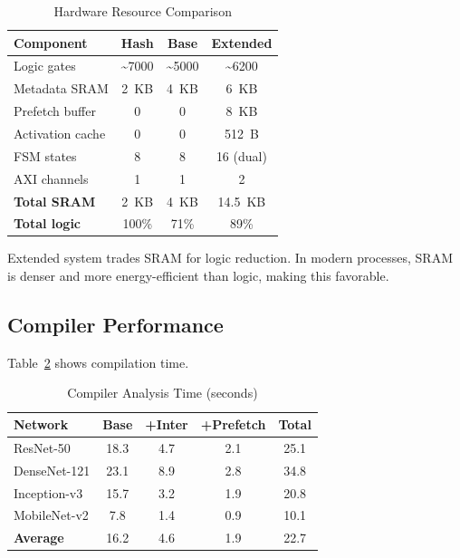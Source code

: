 \documentclass[journal]{IEEEtran}
\begin{document}
\begin{table}[t]
\centering
\caption{Hardware Resource Comparison}
\label{tab:resources_extended}
\small
\begin{tabular}{lccc}
\toprule
\textbf{Component} & \textbf{Hash} & \textbf{Base} & \textbf{Extended} \\
\midrule
Logic gates & \textasciitilde7000 & \textasciitilde5000 & \textasciitilde6200 \\
Metadata SRAM & 2~KB & 4~KB & 6~KB \\
Prefetch buffer & 0 & 0 & 8~KB \\
Activation cache & 0 & 0 & 512~B \\
FSM states & 8 & 8 & 16 (dual) \\
AXI channels & 1 & 1 & 2 \\
\midrule
\textbf{Total SRAM} & 2~KB & 4~KB & 14.5~KB \\
\textbf{Total logic} & 100\% & 71\% & 89\% \\
\bottomrule
\end{tabular}
\end{table}

Extended system trades SRAM for logic reduction. In modern processes, SRAM is denser and more energy-efficient than logic, making this favorable.

\subsection{Compiler Performance}

Table~\ref{tab:compile_time} shows compilation time.

\begin{table}[t]
\centering
\caption{Compiler Analysis Time (seconds)}
\label{tab:compile_time}
\small
\begin{tabular}{lcccc}
\toprule
\textbf{Network} & \textbf{Base} & \textbf{+Inter} & \textbf{+Prefetch} & \textbf{Total} \\
\midrule
ResNet-50 & 18.3 & 4.7 & 2.1 & 25.1 \\
DenseNet-121 & 23.1 & 8.9 & 2.8 & 34.8 \\
Inception-v3 & 15.7 & 3.2 & 1.9 & 20.8 \\
MobileNet-v2 & 7.8 & 1.4 & 0.9 & 10.1 \\
\midrule
\textbf{Average} & 16.2 & 4.6 & 1.9 & 22.7 \\
\bottomrule
\end{tabular}
\end{table}
\end{document}
